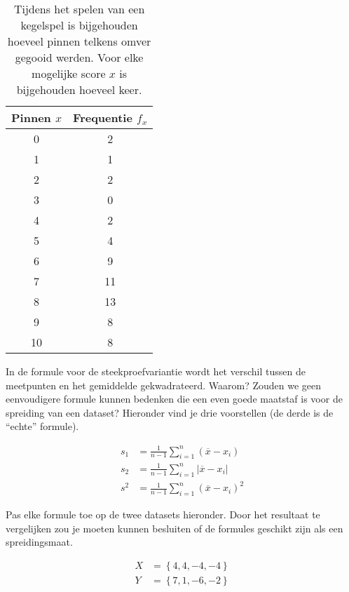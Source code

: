 \begin{table}
  \centering
  \begin{tabular}{cc}
  	\toprule
  	Pinnen $x$ & Frequentie $f_{x}$ \\
  	\midrule
  	    0      &         2          \\
  	    1      &         1          \\
  	    2      &         2          \\
  	    3      &         0          \\
  	    4      &         2          \\
  	    5      &         4          \\
  	    6      &         9          \\
  	    7      &         11         \\
  	    8      &         13         \\
  	    9      &         8          \\
  	    10     &         8          \\
  	\bottomrule
  \end{tabular}
  \caption{Tijdens het spelen van een kegelspel is bijgehouden hoeveel pinnen telkens omver gegooid werden. Voor elke mogelijke score $x$ is bijgehouden hoeveel keer.}
  \label{tab:pinfreq}
\end{table}

\begin{exercise}
  \label{ex:variance-formula}
  In de formule voor de steekproefvariantie wordt het verschil tussen de meetpunten en het gemiddelde gekwadrateerd. Waarom? Zouden we geen eenvoudigere formule kunnen bedenken die een even goede maatstaf is voor de spreiding van een dataset? Hieronder vind je drie voorstellen (de derde is de ``echte'' formule).

  \begin{align}
    s_{1} &= \frac{1}{n-1} \sum_{i=1}^{n} (\overline{x} - x_i) \\
    s_{2} &= \frac{1}{n-1} \sum_{i=1}^{n} \left| \overline{x} - x_i\right| \\
    s^{2} &= \frac{1}{n-1} \sum_{i=1}^{n} (\overline{x} - x_i)^{2}
  \end{align}

  Pas elke formule toe op de twee datasets hieronder. Door het resultaat te vergelijken zou je moeten kunnen besluiten of de formules geschikt zijn als een spreidingsmaat.
  
  \begin{align*}
    X &= \left\{ 4,4,-4,-4 \right\} \\
    Y &= \left\{ 7,1,-6,-2 \right\}
  \end{align*}

\end{exercise}

